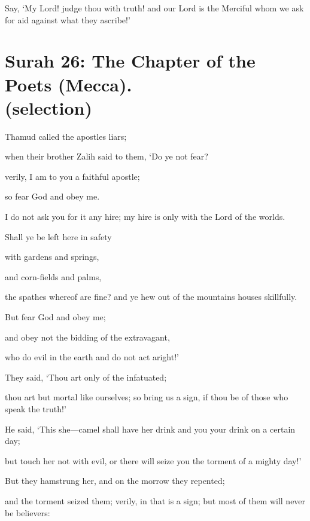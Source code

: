 \documentclass[fontsize=14pt, letterpaper, notitlepage, openany, DIV=12]{scrbook} %
\begin{document}
\noindent[21:112]
Say, `My Lord! judge thou with truth! and our Lord is the Merciful whom we ask for aid
against what they ascribe!'


\section[Surah 26: The Chapter of the Poets (Mecca).]{Surah 26: The Chapter of the Poets (Mecca).\\ (selection)}


\noindent[26:141]
Thamud called the apostles liars;

\noindent[26:142]
when their brother Zalih said to them, `Do ye not fear?

\noindent[26:143]
verily, I am to you a faithful apostle;

\noindent[26:144]
so fear God and obey me.

\noindent[26:145]
I do not ask you for it any hire; my hire is only with the Lord of the worlds.

\noindent[26:146]
Shall ye be left here in safety

\noindent[26:147]
with gardens and springs,

\noindent[26:148]
and corn-fields and palms,

\noindent[26:149]
the spathes whereof are fine? and ye hew out of the mountains houses skillfully.

\noindent[26:150]
But fear God and obey me;

\noindent[26:151]
and obey not the bidding of the extravagant,

\noindent[26:152]
who do evil in the earth and do not act aright!'

\noindent[26:153]
They said, `Thou art only of the infatuated;

\noindent[26:154]
thou art but mortal like ourselves; so bring us a sign, if thou be of those who speak the
truth!'

\noindent[26:155]
He said, `This she---camel shall have her drink and you your drink on a certain day;

\noindent[26:156]
but touch her not with evil, or there will seize you the torment of a mighty day!'

\noindent[26:157]
But they hamstrung her, and on the morrow they repented;

\noindent[26:158]
and the torment seized them; verily, in that is a sign; but most of them will never be
believers:
\end{document}
